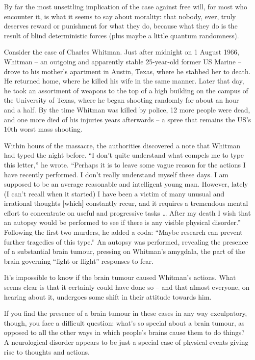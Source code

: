 \documentclass[
]{book}
\begin{document}
By far the most unsettling implication of the case against free will, for most who encounter it, is what it seems to say about morality: that nobody, ever, truly deserves reward or punishment for what they do, because what they do is the result of blind deterministic forces (plus maybe a little quantum randomness).

Consider the case of Charles Whitman. Just after midnight on 1 August 1966, Whitman -- an outgoing and apparently stable 25-year-old former US Marine -- drove to his mother's apartment in Austin, Texas, where he stabbed her to death. He returned home, where he killed his wife in the same manner. Later that day, he took an assortment of weapons to the top of a high building on the campus of the University of Texas, where he began shooting randomly for about an hour and a half. By the time Whitman was killed by police, 12 more people were dead, and one more died of his injuries years afterwards -- a spree that remains the US's 10th worst mass shooting.

Within hours of the massacre, the authorities discovered a note that Whitman had typed the night before. ``I don't quite understand what compels me to type this letter,'' he wrote. ``Perhaps it is to leave some vague reason for the actions I have recently performed. I don't really understand myself these days. I am supposed to be an average reasonable and intelligent young man. However, lately (I can't recall when it started) I have been a victim of many unusual and irrational thoughts {[}which{]} constantly recur, and it requires a tremendous mental effort to concentrate on useful and progressive tasks \ldots{} After my death I wish that an autopsy would be performed to see if there is any visible physical disorder.'' Following the first two murders, he added a coda: ``Maybe research can prevent further tragedies of this type.'' An autopsy was performed, revealing the presence of a substantial brain tumour, pressing on Whitman's amygdala, the part of the brain governing ``fight or flight'' responses to fear.

It's impossible to know if the brain tumour caused Whitman's actions. What seems clear is that it certainly could have done so -- and that almost everyone, on hearing about it, undergoes some shift in their attitude towards him.

If you find the presence of a brain tumour in these cases in any way exculpatory, though, you face a difficult question: what's so special about a brain tumour, as opposed to all the other ways in which people's brains cause them to do things?
A neurological disorder appears to be just a special case of physical events giving rise to thoughts and actions.
\end{document}

